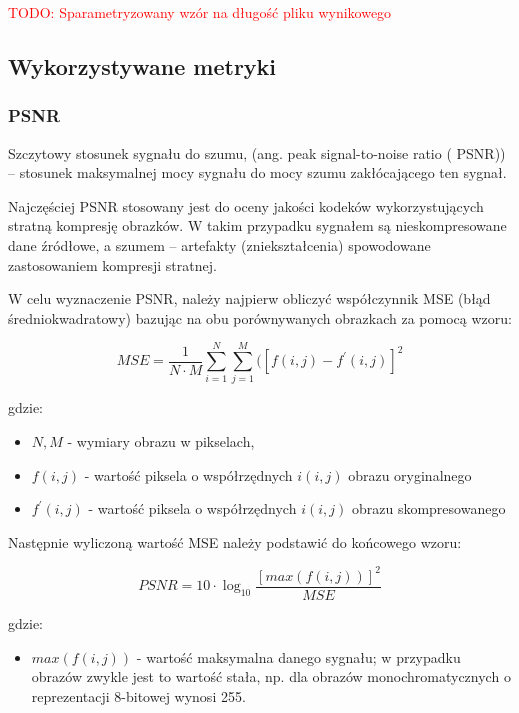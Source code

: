 \documentclass{article}
\newcommand{\todo}[1]{\textcolor{red}{TODO: #1}}
\begin{document}
\todo{Sparametryzowany wzór na długość pliku wynikowego}

\subsection{Wykorzystywane metryki}

\subsubsection{PSNR}

Szczytowy stosunek sygnału do szumu, (ang. peak signal-to-noise ratio ( PSNR)) – stosunek maksymalnej mocy sygnału do mocy szumu zakłócającego ten sygnał.  

Najczęściej PSNR stosowany jest do oceny jakości kodeków wykorzystujących stratną kompresję obrazków. W takim przypadku sygnałem są nieskompresowane dane źródłowe, a szumem – artefakty (zniekształcenia) spowodowane zastosowaniem kompresji stratnej. 

W celu wyznaczenie PSNR, należy najpierw obliczyć współczynnik MSE (błąd średniokwadratowy) bazując na obu porównywanych obrazkach za pomocą wzoru:

\begin{equation}
MSE = \frac{1}{N \cdot M} \sum_{i=1}^N \sum_{j=1}^M ([f(i, j) - f^{'}(i, j)]^2
\end{equation}

gdzie:
\begin{itemize}[label=]
    \item $N, M$ - wymiary obrazu w pikselach,
    \item $f(i, j)$ - wartość piksela o współrzędnych $i(i, j)$ obrazu oryginalnego
    \item $f^{'}(i, j)$ - wartość piksela o współrzędnych $i(i, j)$ obrazu skompresowanego
\end{itemize}

Następnie wyliczoną wartość MSE należy podstawić do końcowego wzoru: 

\begin{equation}
PSNR = 10 \cdot \log_10 \frac{[max(f(i,j))]^2}{MSE}
\end{equation}

gdzie:
\begin{itemize}[label=]
    \item $max(f(i,j))$ - wartość maksymalna danego sygnału; w przypadku obrazów zwykle jest to wartość stała, np. dla obrazów monochromatycznych o reprezentacji 8-bitowej wynosi 255.
\end{itemize}
\end{document}
